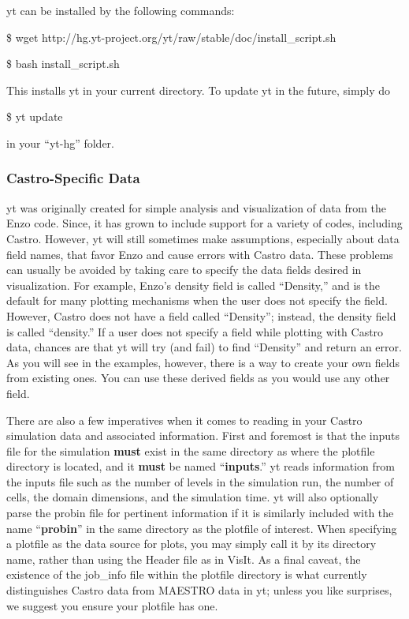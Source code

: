 yt can be installed by the following commands:

\$ wget http://hg.yt-project.org/yt/raw/stable/doc/install\_script.sh

\$ bash install\_script.sh

This installs yt in your current directory. To update yt in the future, simply do

\$ yt update

in your ``yt-hg'' folder.

\subsubsection{Castro-Specific Data}

yt was originally created for simple analysis and visualization of data from the Enzo code. Since, it has grown to include support for a variety of codes, including Castro. However, yt will still sometimes make assumptions, especially about data field names, that favor Enzo and cause errors with Castro data. These problems can usually be avoided by taking care to specify the data fields desired in visualization. For example, Enzo's density field is called ``Density,'' and is the default for many plotting mechanisms when the user does not specify the field. However, Castro does not have a field called ``Density''; instead, the density field is called ``density.'' If a user does not specify a field while plotting with Castro data, chances are that yt will try (and fail) to find ``Density'' and return an error. As you will see in the examples, however, there is a way to create your own fields from existing ones. You can use these derived fields as you would use any other field.

There are also a few imperatives when it comes to reading in your Castro simulation data and associated information. First and foremost is that the inputs file for the simulation {\bf must} exist in the same directory as where the plotfile directory is located, and it {\bf must} be named ``{\bf inputs}.'' yt reads information from the inputs file such as the number of levels in the simulation run, the number of cells, the domain dimensions, and the simulation time. yt will also optionally parse the probin file for pertinent information if it is similarly included with the name ``{\bf probin}'' in the same directory as the plotfile of interest. When specifying a plotfile as the data source for plots, you may simply call it by its directory name, rather than using the Header file as in VisIt. As a final caveat, the existence of the job\_info file within the plotfile directory is what currently distinguishes Castro data from MAESTRO data in yt; unless you like surprises, we suggest you ensure your plotfile has one.


